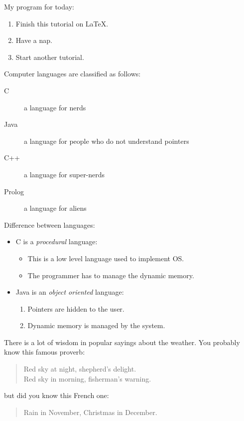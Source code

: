\documentclass[12pt]{scrartcl}
\begin{document}
My program for today:
\begin{enumerate}
	\item Finish this tutorial on \LaTeX.
	\item Have a nap.
	\item Start another tutorial.
\end{enumerate}



Computer languages are classified as follows:
\begin{description}
	\item[C] a language for nerds
	\item[Java] a language for people who do not understand
	pointers

	\item[C++] a language for super-nerds
	\item[Prolog] a language for aliens
\end{description}


Difference between languages:
\begin{itemize}
	\item C is a \emph{procedural} language:
	\begin{itemize}
		\item This is a low level language used to implement
		OS.
		\item The programmer has to manage the dynamic memory.
	\end{itemize}
	\item Java is an \emph{object oriented} language:
	\begin{enumerate}
		\item Pointers are hidden to the user.
		\item Dynamic memory is managed by the system.
	\end{enumerate}
\end{itemize}



There is a lot of wisdom in popular sayings about
the weather.
You probably know this famous proverb:
\begin{quote}
	Red sky at night, shepherd’s delight.\\
	Red sky in morning, fisherman’s warning.
\end{quote}
but did you know this French one:
\begin{quote}
	Rain in November, Christmas in December.
\end{quote}
\end{document}
